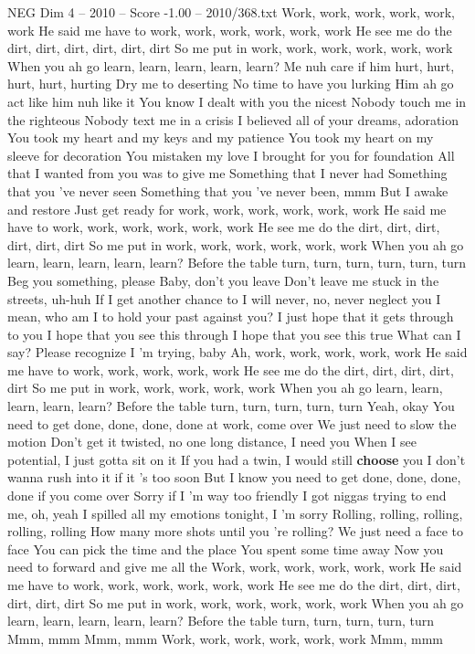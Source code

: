 \begin{textsample}{NEG Dim 4 – 2010 – Score -1.00 – 2010/368.txt}  \label{ex:f4_neg_016}
Work, work, work, work, work, work He said me have to work, work, work, work, work, work He see me do the dirt, dirt, dirt, dirt, dirt, dirt So me put in work, work, work, work, work, work When you ah go learn, learn, learn, learn, learn?
Me nuh care if him hurt, hurt, hurt, hurt, hurting Dry me to deserting No time to have you lurking Him ah go act like him nuh like it You know I dealt with you the nicest Nobody touch me in the righteous Nobody text me in a crisis I believed all of your dreams, adoration You took my heart and my keys and my patience You took my heart on my sleeve for decoration You mistaken my love I brought for you for foundation All that I wanted from you was to give me Something that I never had Something that you 've never seen Something that you 've never been, mmm But I awake and restore Just get ready for work, work, work, work, work, work He said me have to work, work, work, work, work, work He see me do the dirt, dirt, dirt, dirt, dirt, dirt So me put in work, work, work, work, work, work When you ah go learn, learn, learn, learn, learn?
Before the table turn, turn, turn, turn, turn, turn Beg you something, please Baby, don't you leave Don't leave me stuck in the streets, uh-huh If I get another chance to I will never, no, never neglect you I mean, who am I to hold your past against you?
I just hope that it gets through to you I hope that you see this through I hope that you see this true What can I say?
Please recognize I 'm trying, baby Ah, work, work, work, work, work He said me have to work, work, work, work, work He see me do the dirt, dirt, dirt, dirt, dirt So me put in work, work, work, work, work When you ah go learn, learn, learn, learn, learn?
Before the table turn, turn, turn, turn, turn Yeah, okay You need to get done, done, done, done at work, come over We just need to slow the motion Don't get it twisted, no one long distance, I need you When I see potential, I just gotta sit on it If you had a twin, I would still \textbf{choose} you I don't wanna rush into it if it 's too soon But I know you need to get done, done, done, done if you come over Sorry if I 'm way too friendly I got niggas trying to end me, oh, yeah I spilled all my emotions tonight, I 'm sorry Rolling, rolling, rolling, rolling, rolling How many more shots until you 're rolling?
We just need a face to face You can pick the time and the place You spent some time away Now you need to forward and give me all the Work, work, work, work, work, work He said me have to work, work, work, work, work, work He see me do the dirt, dirt, dirt, dirt, dirt, dirt So me put in work, work, work, work, work, work When you ah go learn, learn, learn, learn, learn?
Before the table turn, turn, turn, turn, turn Mmm, mmm Mmm, mmm Work, work, work, work, work, work Mmm, mmm

\end{textsample}
